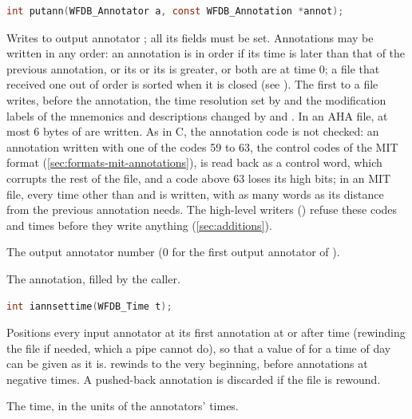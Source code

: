 \begin{lstlisting}[language=C,style=signature]
int putann(WFDB_Annotator a, const WFDB_Annotation *annot);
\end{lstlisting}
Writes  to output annotator ; all its fields must be
set. Annotations may be written in any order: an annotation is in order if
its time is later than that of the previous annotation, or its  or
its  is greater, or both are at time 0; a file that received one out
of order is sorted when it is closed (see ). The first
 to a file writes, before the annotation, the time resolution set
by  and the modification labels of the mnemonics and
descriptions changed by  and . In an AHA
file, at most 6 bytes of  are written. As in C, the annotation
code is not checked: an annotation written with one of the codes 59 to 63,
the control codes of the MIT format (\cref{sec:formats-mit-annotations}), is read back as a
control word, which corrupts the rest of the file, and a code above 63
loses its high bits; in an MIT file, every time other than
 and  is written, with as many  words as its
distance from the previous annotation needs. The high-level writers
() refuse these codes and times before they write
anything (\cref{sec:additions}).
\begin{params}
\item[a] The output annotator number (0 for the first output annotator of
  ).
\item[annot] The annotation, filled by the caller.
\end{params}

\begin{lstlisting}[language=C,style=signature]
int iannsettime(WFDB_Time t);
\end{lstlisting}
Positions every input annotator at its first annotation at or after time
 (rewinding the file if needed, which a pipe cannot do), so that a
value of  for a time of day can be given as it is.
 rewinds to the very beginning, before annotations at
negative times. A pushed-back annotation is discarded if the file is rewound.
\begin{params}
\item[t] The time, in the units of the annotators' times.
\end{params}

